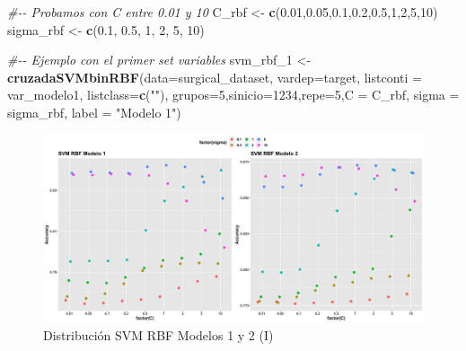 \documentclass[
]{article}
\newenvironment{Shaded}{\begin{snugshade}}{\end{snugshade}}
\newcommand{\CommentTok}[1]{\textcolor[rgb]{0.56,0.35,0.01}{\textit{#1}}}
\newcommand{\DataTypeTok}[1]{\textcolor[rgb]{0.13,0.29,0.53}{#1}}
\newcommand{\DecValTok}[1]{\textcolor[rgb]{0.00,0.00,0.81}{#1}}
\newcommand{\FloatTok}[1]{\textcolor[rgb]{0.00,0.00,0.81}{#1}}
\newcommand{\KeywordTok}[1]{\textcolor[rgb]{0.13,0.29,0.53}{\textbf{#1}}}
\newcommand{\NormalTok}[1]{#1}
\newcommand{\StringTok}[1]{\textcolor[rgb]{0.31,0.60,0.02}{#1}}
\begin{document}
\begin{Shaded}
\begin{Highlighting}[]
\CommentTok{\#{-}{-} Probamos con C entre 0.01 y 10}
\NormalTok{C\_rbf      <{-}}\StringTok{ }\KeywordTok{c}\NormalTok{(}\FloatTok{0.01}\NormalTok{,}\FloatTok{0.05}\NormalTok{,}\FloatTok{0.1}\NormalTok{,}\FloatTok{0.2}\NormalTok{,}\FloatTok{0.5}\NormalTok{,}\DecValTok{1}\NormalTok{,}\DecValTok{2}\NormalTok{,}\DecValTok{5}\NormalTok{,}\DecValTok{10}\NormalTok{)}
\NormalTok{sigma\_rbf  <{-}}\StringTok{ }\KeywordTok{c}\NormalTok{(}\FloatTok{0.1}\NormalTok{, }\FloatTok{0.5}\NormalTok{, }\DecValTok{1}\NormalTok{, }\DecValTok{2}\NormalTok{, }\DecValTok{5}\NormalTok{, }\DecValTok{10}\NormalTok{)}

\CommentTok{\#{-}{-} Ejemplo con el primer set variables}
\NormalTok{svm\_rbf\_}\DecValTok{1}\NormalTok{ <{-}}\StringTok{ }\KeywordTok{cruzadaSVMbinRBF}\NormalTok{(}\DataTypeTok{data=}\NormalTok{surgical\_dataset, }\DataTypeTok{vardep=}\NormalTok{target,}
                              \DataTypeTok{listconti =}\NormalTok{ var\_modelo1, }\DataTypeTok{listclass=}\KeywordTok{c}\NormalTok{(}\StringTok{""}\NormalTok{),}
                              \DataTypeTok{grupos=}\DecValTok{5}\NormalTok{,}\DataTypeTok{sinicio=}\DecValTok{1234}\NormalTok{,}\DataTypeTok{repe=}\DecValTok{5}\NormalTok{,}\DataTypeTok{C =}\NormalTok{ C\_rbf,}
                              \DataTypeTok{sigma =}\NormalTok{ sigma\_rbf, }\DataTypeTok{label =} \StringTok{"Modelo 1"}\NormalTok{)}
\end{Highlighting}
\end{Shaded}

\begin{figure}[h!]

{\centering \includegraphics[width=0.99\linewidth,height=0.99\textheight,]{./charts/SVM/svm_rbf_modelos1_2} 

}

\caption{Distribución SVM RBF Modelos 1 y 2 (I)}\label{fig:unnamed-chunk-122}
\end{figure}
\end{document}
